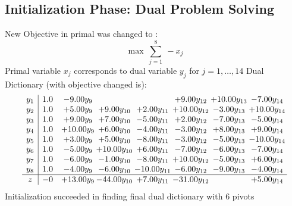 \documentclass[9pt]{article}
\begin{document}
\subsection{Initialization Phase: Dual Problem Solving}
New Objective in primal was changed to : \[ \max\ \sum_{j=1}^{8}\ - x_j \] 
Primal variable $x_j$ corresponds to dual variable $y_j$ for $j = 1,\ldots,14$
Dual Dictionary (with objective changed is): 
\[\begin{array}{c| c c@{\hskip 2pt} c@{\hskip 2pt} c@{\hskip 2pt} c@{\hskip 2pt} c@{\hskip 2pt} c@{\hskip 2pt} }
 y_{1}   &  1.0 & -9.00 y_{9} &    &   & +  9.00 y_{12} & + 10.00 y_{13} & -7.00 y_{14}\\
 y_{2}   &  1.0 & +  5.00 y_{9} & +  9.00 y_{10} & +  2.00 y_{11} & + 10.00 y_{12} & -3.00 y_{13} & + 10.00 y_{14}\\
 y_{3}   &  1.0 & +  9.00 y_{9} & +  7.00 y_{10} & -5.00 y_{11} & +  2.00 y_{12} & -7.00 y_{13} & -5.00 y_{14}\\
 y_{4}   &  1.0 & + 10.00 y_{9} & +  6.00 y_{10} & -4.00 y_{11} & -3.00 y_{12} & +  8.00 y_{13} & +  9.00 y_{14}\\
 y_{5}   &  1.0 & +  3.00 y_{9} & +  5.00 y_{10} & -8.00 y_{11} & -3.00 y_{12} & -5.00 y_{13} & -10.00 y_{14}\\
 y_{6}   &  1.0 & -5.00 y_{9} & + 10.00 y_{10} & +  6.00 y_{11} & -7.00 y_{12} & -6.00 y_{13} & -7.00 y_{14}\\
 y_{7}   &  1.0 & -6.00 y_{9} & -1.00 y_{10} & -8.00 y_{11} & + 10.00 y_{12} & -5.00 y_{13} & +  6.00 y_{14}\\
 y_{8}   &  1.0 & -4.00 y_{9} & -6.00 y_{10} & -10.00 y_{11} & -6.00 y_{12} & -9.00 y_{13} & -4.00 y_{14}\\
\hline
z    &  -0 & + 13.00 y_{9} & -44.00 y_{10} & +  7.00 y_{11} & -31.00 y_{12} &   & +  5.00 y_{14}\\
\end{array}\]
Initialization succeeded in finding final dual dictionary with 6 pivots
\end{document}

